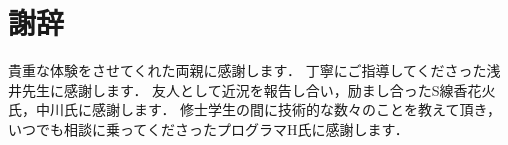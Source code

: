 \chapter*{謝辞}

貴重な体験をさせてくれた両親に感謝します．
丁寧にご指導してくださった浅井先生に感謝します．
友人として近況を報告し合い，励まし合ったS線香花火氏，中川氏に感謝します．
修士学生の間に技術的な数々のことを教えて頂き，
いつでも相談に乗ってくださったプログラマH氏に感謝します．
